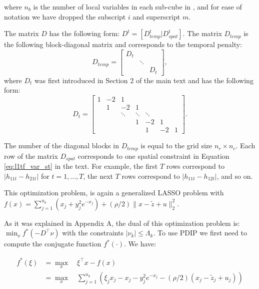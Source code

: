 \documentclass[letterpaper]{article} %
\newcommand{\autoref}{\Cref}
\begin{document}
\noindent where $n_b$ is the number of local variables in each sub-cube in \autoref{fig:data_cube}, and for ease of notation we have dropped the subscript $i$ and superscript $m$. 

The matrix $D$ has the following form:  $D^t=[D_{temp}^t|D_{spat}^t]$. The matrix $D_{temp}$ is the following block-diagonal matrix and corresponds to the temporal penalty: 
\begin{equation}
D_{temp}=\begin{bmatrix}
D_t &  & \\ 
& \ddots & \\
&  & D_t
\end{bmatrix},
\label{eq:d_t_matrix}
\end{equation}
where $D_t$ was first introduced in Section 2 of the main text and has the following form:
\begin{equation}
 D_t=\begin{bmatrix}
 1 & -2 & 1 &  &  &  &\\ 
 & 1 & -2 & 1 &  &  &\\ 
 &  & \ddots & \ddots & \ddots  &  &\\ 
 &  & & 1 & -2 & 1 &  \\ 
 &  &  &   & 1 & -2 & 1 
 \end{bmatrix}.
\label{eq:d_matrix}
\end{equation}

The number of the diagonal blocks in $D_{temp}$ is equal to the grid
size $n_r \times n_c$. Each row of the matrix $D_{spat}$ corresponds
to one spatial constraint in Equation \eqref{eq:l1tf_var_st} in the
text. For example, the first $T$ rows correspond to
$|h_{11t}-h_{21t}|$ for $t=1,...,T$, the next $T$ rows correspond to
$|h_{11t}-h_{12t}|$, and so on.  


This optimization problem, is again a generalized LASSO problem with
$f(x)=\sum_{j=1}^{n_b} (x_j + y_j^2e^{-x_j}) + (\rho/2) \lVert
x-\tilde{z} + u \lVert_2^2$.  

As it was explained in Appendix A, the dual of this optimization
problem is: $\min_\nu f^*(-D^\top\nu)$ with the constraints $|\nu_k|
\le \Lambda_k$. To use PDIP we first need to compute the conjugate
function $f^*(\cdot)$. We have: 


\begin{align}
f^*(\xi) & = \max_x \quad \xi^\top x - f(x)\\
& =  \max_x \quad \sum_{j=1}^{n_b} (\xi_jx_j - x_j - y_j^2e^{-x_j} - (\rho/2)(x_j-\tilde{z}_j+u_j))
\label{eq:conjugate}
\end{align}
\end{document}
